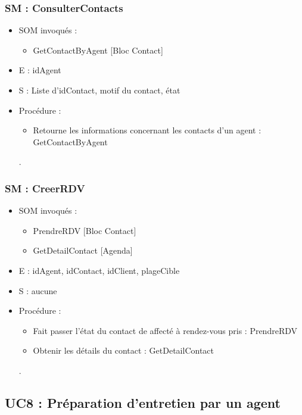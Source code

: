 \subsubsection{SM : ConsulterContacts}
\begin{itemize}
	\item SOM invoqués : 
	\begin{itemize}
		\item GetContactByAgent [Bloc Contact]
	\end{itemize}
	\item E : idAgent
	\item S : Liste d’idContact, motif du contact, état
	\item Procédure : 
	\begin{itemize}
		\item Retourne les informations concernant les contacts d'un agent : GetContactByAgent
	\end{itemize}.
\end{itemize}

\subsubsection{SM : CreerRDV}
\begin{itemize}
	\item SOM invoqués : 
	\begin{itemize}
		\item PrendreRDV [Bloc Contact]
		\item GetDetailContact [Agenda]
	\end{itemize}
	\item E : idAgent, idContact, idClient, plageCible
	\item S : aucune
	\item Procédure : 
	\begin{itemize}
		\item Fait passer l’état du contact de affecté à rendez-vous pris : PrendreRDV
		\item Obtenir les détails du contact : GetDetailContact
	\end{itemize}.
\end{itemize}



\subsection{UC8 : Préparation d’entretien par un agent}
